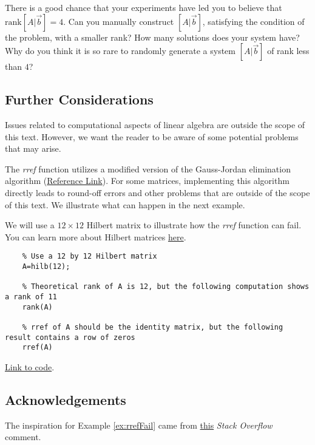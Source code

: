 \documentclass{ximera}
\begin{document}
\begin{problem}
    There is a good chance that your experiments have led you to believe that $\text{rank}[A | \vec{b}]=4$.  Can you manually construct $[A | \vec{b}]$, satisfying the condition of the problem, with a smaller rank?  How many solutions does your system have?  Why do you think it is so rare to randomly generate a system $[A | \vec{b}]$ of rank less than $4$?
    
\end{problem}

\subsection*{Further Considerations}
Issues related to computational aspects of linear algebra are outside the scope of this text.  However, we want the reader to be aware of some potential problems that may arise.

\begin{warning}
    The \emph{rref} function utilizes a modified version of the Gauss-Jordan elimination algorithm (\href{https://www.mathworks.com/help/matlab/ref/rref.html}{Reference Link}).  For some matrices, implementing this algorithm directly leads to round-off errors and other problems that are outside of the scope of this text.  %
    We illustrate what can happen in the next example.   
\end{warning}

\begin{example}\label{ex:rrefFail}
    We will use a $12\times 12$ Hilbert matrix to illustrate how the \emph{rref} function can fail.  You can learn more about Hilbert matrices \href{https://en.wikipedia.org/wiki/Hilbert_matrix}{here}.

    \begin{verbatim}
    % Use a 12 by 12 Hilbert matrix
    A=hilb(12);

    % Theoretical rank of A is 12, but the following computation shows a rank of 11
    rank(A)

    % rref of A should be the identity matrix, but the following result contains a row of zeros
    rref(A)
    \end{verbatim}

    \href{https://sagecell.sagemath.org/?z=eJxtjjEOwjAMRfdKuYOXSkViSVfE0I0DwAGS1iUWaYwSR6WcnrSFjcWyrP_fcw23hGBAt2CXdV7IW4wCk5FIL1V1Z1cujW4PJ1WpqoarQ44o1BsP0YQH8AgdUCrlI9gsIA5hZO95pnCHnqdnFiPEAZLjORXZr6a1qta96Q47O0Ycd16JZj-AxQ1HAwYhWb5f_fNETNlL0QUxFDYLzyvrjZFT8RR08XwAMi9N1g==&lang=octave&interacts=eJyLjgUAARUAuQ==}{Link to code}.

\end{example}

\subsection*{Acknowledgements}

The inspiration for Example \ref{ex:rrefFail} came from \href{https://stackoverflow.com/questions/42893111/matlab-rref-function-precision-error-after-12th-column-of-hilbert-matrices}{this} \emph{Stack Overflow} comment.
\end{document}
